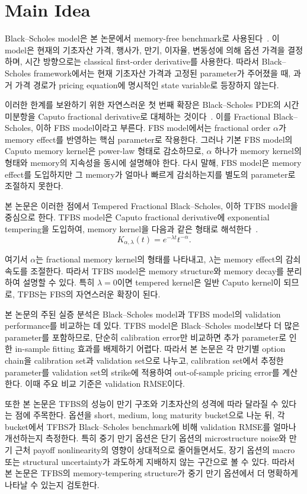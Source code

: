 \documentclass[11pt,a4paper]{report}
\begin{document}
\section{Main Idea}

Black--Scholes model은 본 논문에서 memory-free benchmark로 사용된다~\cite{BlackScholes1973,Merton1973}. 이 model은 현재의 기초자산 가격, 행사가, 만기, 이자율, 변동성에 의해 옵션 가격을 결정하며, 시간 방향으로는 classical first-order derivative를 사용한다. 따라서 Black–Scholes framework에서는 현재 기초자산 가격과 고정된 parameter가 주어졌을 때, 과거 가격 경로가 pricing equation에 명시적인 state variable로 등장하지 않는다.

이러한 한계를 보완하기 위한 자연스러운 첫 번째 확장은 Black--Scholes PDE의 시간 미분항을 Caputo fractional derivative로 대체하는 것이다~\cite{Podlubny1999,Wyss2000}. 이를 Fractional Black--Scholes, 이하 FBS model이라고 부른다. FBS model에서는 fractional order $\alpha$가 memory effect를 반영하는 핵심 parameter로 작용한다. 그러나 기본 FBS model의 Caputo memory kernel은 power-law 형태로 감소하므로, $\alpha$ 하나가 memory kernel의 형태와 memory의 지속성을 동시에 설명해야 한다. 다시 말해, FBS model은 memory effect를 도입하지만 그 memory가 얼마나 빠르게 감쇠하는지를 별도의 parameter로 조절하지 못한다.

본 논문은 이러한 점에서 Tempered Fractional Black--Scholes, 이하 TFBS model을 중심으로 한다. TFBS model은 Caputo fractional derivative에 exponential tempering을 도입하여, memory kernel을 다음과 같은 형태로 해석한다~\cite{SabzikarMeerschaertChen2015}.
\[
K_{\alpha,\lambda}(t)
=
e^{-\lambda t}t^{-\alpha}.
\]

여기서 $\alpha$는 fractional memory kernel의 형태를 나타내고, $\lambda$는 memory effect의 감쇠 속도를 조절한다. 따라서 TFBS model은 memory structure와 memory decay를 분리하여 설명할 수 있다. 특히 $\lambda=0$이면 tempered kernel은 일반 Caputo kernel이 되므로, TFBS는 FBS의 자연스러운 확장이 된다.

본 논문의 주된 실증 분석은 Black--Scholes model과 TFBS model의 validation performance를 비교하는 데 있다. TFBS model은 Black--Scholes model보다 더 많은 parameter를 포함하므로, 단순히 calibration error만 비교하면 추가 parameter로 인한 in-sample fitting 효과를 배제하기 어렵다. 따라서 본 논문은 각 만기별 option chain을 calibration set과 validation set으로 나누고, calibration set에서 추정한 parameter를 validation set의 strike에 적용하여 out-of-sample pricing error를 계산한다. 이때 주요 비교 기준은 validation RMSE이다.

또한 본 논문은 TFBS의 성능이 만기 구조와 기초자산의 성격에 따라 달라질 수 있다는 점에 주목한다. 옵션을 short, medium, long maturity bucket으로 나눈 뒤, 각 bucket에서 TFBS가 Black--Scholes benchmark에 비해 validation RMSE를 얼마나 개선하는지 측정한다. 특히 중기 만기 옵션은 단기 옵션의 microstructure noise와 만기 근처 payoff nonlinearity의 영향이 상대적으로 줄어들면서도, 장기 옵션의 macro 또는 structural uncertainty가 과도하게 지배하지 않는 구간으로 볼 수 있다. 따라서 본 논문은 TFBS의 memory-tempering structure가 중기 만기 옵션에서 더 명확하게 나타날 수 있는지 검토한다.
\end{document}
